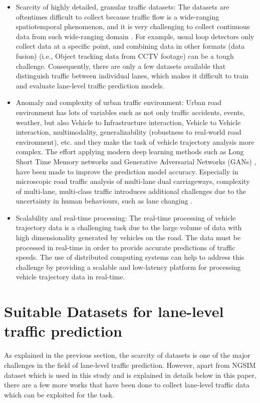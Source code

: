 \documentclass[11pt]{uonthesis}
\begin{document}
\begin{itemize}
    \item Scarcity of highly detailed, granular traffic datasets:
The datasets are oftentimes difficult to collect because traffic flow is a wide-ranging spatiotemporal phenomenon, and it is very challenging to collect continuous data from such wide-ranging domain \cite{seo2020evaluation}. For example, usual loop detectors only collect data at a specific point, and combining data in other formats (data fusion) (i.e., Object tracking data from CCTV footage) can be a tough challenge. Consequently, there are only a few datasets available that distinguish traffic between individual lanes, which makes it difficult to train and evaluate lane-level traffic prediction models.
    \item Anomaly and complexity of urban traffic environment:
Urban road environment has lots of variables such as not only traffic accidents, events, weather, but also Vehicle to Infrastructure interaction, Vehicle to Vehicle interaction, multimodality, generalizability (robustness to real-world road environment), etc. and they make the task of vehicle trajectory analysis more complex. The effort applying modern deep learning methods such as Long Short Time Memory networks and Generative Adversarial Networks (GANs) \cite{rossi2021vehicle}, have been made to improve the prediction model accuracy. Especially in microscopic road traffic analysis of multi-lane dual carriageways, complexity of multi-lane, multi-class traffic introduces additional challenges due to the uncertainty in human behaviours, such as lane changing \cite{DAHIYA2022100066}.
    \item Scalability and real-time processing:
The real-time processing of vehicle trajectory data is a challenging task due to the large volume of data with high dimensionality generated by vehicles on the road. The data must be processed in real-time in order to provide accurate predictions of traffic speeds. The use of distributed computing systems can help to address this challenge by providing a scalable and low-latency platform for processing vehicle trajectory data in real-time.  %
\end{itemize}

\section{Suitable Datasets for lane-level traffic prediction}
As explained in the previous section, the scarcity of datasets is one of the major challenges in the field of lane-level traffic prediction. However, apart from NGSIM dataset which is used in this study and is explained in details below in this paper, there are a few more works that have been done to collect lane-level traffic data which can be exploited for the task. 
\end{document}
